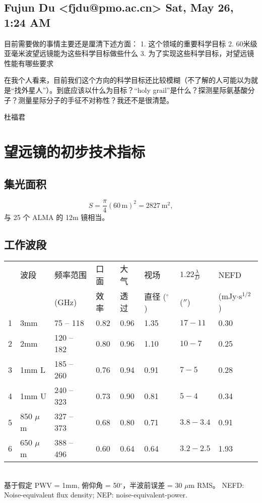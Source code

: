 \documentclass{article}
\newcommand\from[2]{\subsection{{#1} {#2}}}
\newcommand\said[1]{#1}
\begin{document}
\from{
Fujun Du <fjdu@pmo.ac.cn>
}{
Sat, May 26, 1:24 AM
}
\said{
目前需要做的事情主要还是厘清下述方面：
1. 这个领域的重要科学目标
2. 60米级亚毫米波望远镜能为这些科学目标做些什么
3. 为了实现这些科学目标，对望远镜性能有哪些要求

在我个人看来，目前我们这个方向的科学目标还比较模糊（不了解的人可能以为就是“找外星人”）。到底应该以什么为目标？“holy grail”是什么？探测星际氨基酸分子？测量星际分子的手征不对称性？我还不是很清楚。

杜福君
}

\section{望远镜的初步技术指标}

\subsection{集光面积}
\begin{equation}
  S = \frac{\pi}{4} (60\,\text{m})^2 = 2827~\text{m}^2,
\end{equation}
与 25 个 ALMA 的 12m 镜相当。

\subsection{工作波段}

{\scriptsize
\noindent\begin{tabular}{l|l|l|l|l|l|l|l}
  & 波段 & 频率范围 & 口面 & 大气 & 视场 & $1.22\frac{\lambda}{D}$ & NEFD \\
  &      & (GHz) & 效率 & 透过 & 直径 ($^\circ$)  & ($''$) & (mJy$\cdot$s$^{1/2}$) \\
\hline
1 & 3mm & 75 -- 118 & 0.82         & 0.96 & 1.35 & $17-11$   & 0.30 \\
2 & 2mm & 120 -- 182 & 0.80        & 0.96 & 1.10 & $10-7$    & 0.25 \\
3 & 1mm L & 185 -- 260 & 0.76      & 0.94 & 0.91 & $7-5$     & 0.28 \\
4 & 1mm U & 240 -- 323 & 0.73      & 0.90 & 0.81 & $5-4$     & 0.34 \\
5 & 850 $\mu$m & 327 -- 373 & 0.68 & 0.80 & 0.71 & $3.8-3.4$ & 0.91 \\
6 & 650 $\mu$m & 388 -- 496 & 0.60 & 0.64 & 0.64 & $3.2-2.5$ & 1.93
\end{tabular}
}\\
基于假定 PWV = {1}mm, 俯仰角 = 50$^\circ$，半波前误差 = 30 $\mu$m RMS。
NEFD: Noise-equivalent flux density;
NEP: noise-equivalent-power.
\end{document}
